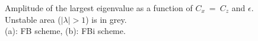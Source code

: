 \documentclass[a4paper,11pt]{article}
\begin{document}
\begin{figure}[!ht]
   \centering
   \quad
   \caption {Amplitude of the largest eigenvalue as a function of $C_x\ =\ C_z$ and $\epsilon$.\\
   Unstable area ($\mid\lambda\mid >1$) is in grey.\\
   (a): FB scheme, (b): FBi scheme. }
   \label{Figstabsurf}
\end{figure}
\end{document}
